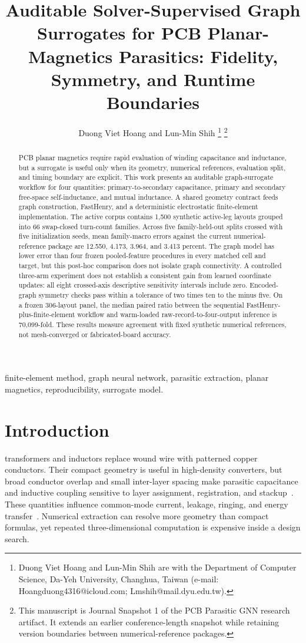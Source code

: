 \documentclass[journal]{IEEEtran}
\title{Auditable Solver-Supervised Graph Surrogates for PCB Planar-Magnetics Parasitics: Fidelity, Symmetry, and Runtime Boundaries}
\author{Duong Viet Hoang and Lun-Min Shih%
\thanks{Duong Viet Hoang and Lun-Min Shih are with the Department of Computer Science, Da-Yeh University, Changhua, Taiwan (e-mail: Hoangduong4316@icloud.com; Lmshih@mail.dyu.edu.tw).}%
\thanks{This manuscript is Journal Snapshot 1 of the PCB Parasitic GNN research artifact. It extends an earlier conference-length snapshot while retaining version boundaries between numerical-reference packages.}}
\begin{document}
\maketitle

\begin{abstract}
PCB planar magnetics require rapid evaluation of winding capacitance and inductance, but a surrogate is useful only when its geometry, numerical references, evaluation split, and timing boundary are explicit. This work presents an auditable graph-surrogate workflow for four quantities: primary-to-secondary capacitance, primary and secondary free-space self-inductance, and mutual inductance. A shared geometry contract feeds graph construction, FastHenry, and a deterministic electrostatic finite-element implementation. The active corpus contains 1,500 synthetic active-leg layouts grouped into 66 swap-closed turn-count families. Across five family-held-out splits crossed with five initialization seeds, mean family-macro errors against the current numerical-reference package are 12.550, 4.173, 3.964, and 3.413 percent. The graph model has lower error than four frozen pooled-feature procedures in every matched cell and target, but this post-hoc comparison does not isolate graph connectivity. A controlled three-arm experiment does not establish a consistent gain from learned coordinate updates: all eight crossed-axis descriptive sensitivity intervals include zero. Encoded-graph symmetry checks pass within a tolerance of two times ten to the minus five. On a frozen 306-layout panel, the median paired ratio between the sequential FastHenry-plus-finite-element workflow and warm-loaded raw-record-to-four-output inference is 70,099-fold. These results measure agreement with fixed synthetic numerical references, not mesh-converged or fabricated-board accuracy.
\end{abstract}

\begin{IEEEkeywords}
finite-element method, graph neural network, parasitic extraction, planar magnetics, reproducibility, surrogate model.
\end{IEEEkeywords}

\section{Introduction}
 transformers and inductors replace wound wire with patterned copper conductors. Their compact geometry is useful in high-density converters, but broad conductor overlap and small inter-layer spacing make parasitic capacitance and inductive coupling sensitive to layer assignment, registration, and stackup~\cite{ouyang,hurley,mclyman,erickson}. These quantities influence common-mode current, leakage, ringing, and energy transfer~\cite{ott,paul}. Numerical extraction can resolve more geometry than compact formulas, yet repeated three-dimensional computation is expensive inside a design search.
\end{document}
